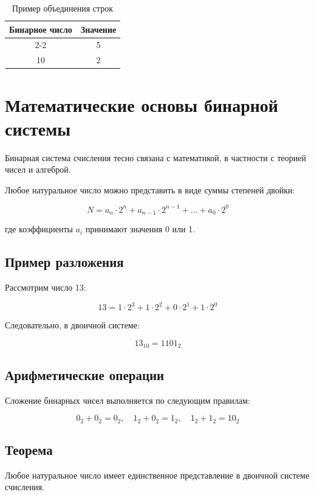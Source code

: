\documentclass[a4paper, 12pt]{report}
\begin{document}
	\begin{table}[h]
		\centering
		\begin{tabular}{|c|c|}
			\hline
			\multirow{2}{*}{Бинарное число} & Значение \\ \cline{2-2}
											& 5 \\ \hline
			10 & 2 \\ \hline
		\end{tabular}
		\caption{Пример объединения строк}
		\label{tab:two}
	\end{table}
	
	\chapter{Математические основы бинарной системы}
	
	Бинарная система счисления тесно связана с математикой, в частности с теорией чисел и алгеброй.
	
	Любое натуральное число можно представить в виде суммы степеней двойки:
	
	\[
	N = a_n \cdot 2^n + a_{n-1} \cdot 2^{n-1} + \dots + a_0 \cdot 2^0
	\]
	
	где коэффициенты $a_i$ принимают значения 0 или 1.
	
	\section{Пример разложения}
	
	Рассмотрим число 13:
	
	\[
	13 = 1 \cdot 2^3 + 1 \cdot 2^2 + 0 \cdot 2^1 + 1 \cdot 2^0
	\]
	
	Следовательно, в двоичной системе:
	
	\[
	13_{10} = 1101_2
	\]
	
	\section{Арифметические операции}
	
	Сложение бинарных чисел выполняется по следующим правилам:
	
	\[
	0_2 + 0_2 = 0_2,\quad 1_2 + 0_2 = 1_2,\quad 1_2 + 1_2 = 10_2
	\]
	
	\section{Теорема}
	
	Любое натуральное число имеет единственное представление в двоичной системе счисления.
	
\end{document}
